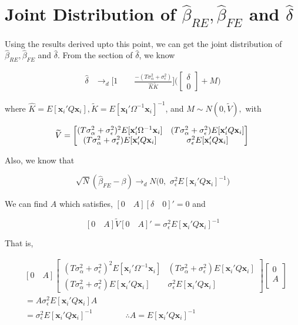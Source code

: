 \documentclass[11pt]{article}
\begin{document}
\section*{Joint Distribution of $\widehat{\beta}_{RE}, \widehat{\beta}_{FE}$ and $\widehat{\delta}$}

Using the results derived upto this point, we can get the joint distribution of $\widehat{\beta}_{RE}, \widehat{\beta}_{FE}$ and $\widehat{\delta}$. From the section of $\widehat{\delta}$, we know

\begin{align*}
\widehat{\delta} & \rightarrow_d \bigg [1 \qquad \frac{-(T\sigma_\alpha^2 +\sigma_\epsilon^2)}{\widehat{K} \widetilde{K}} \bigg ]  \bigg( \begin{bmatrix}
\delta \\
0  
\end{bmatrix} + M\bigg)
\end{align*}

where $ \widehat{K} = E[\mathbf{x}_i' Q \mathbf{x}_i],  \widetilde{K}=E[\mathbf{x_i}' \Omega^{-1} \mathbf{x}_i]^{-1}$, and $M \sim N(0, \widetilde{V}),$ with

\[
\widetilde{V} =  \begin{bmatrix}
(T\sigma_\alpha^2 + \sigma_\epsilon^2)^2 E[\mathbf{x}_i' \Omega^{-1} \mathbf{x}_i] & (T\sigma_\alpha^2 + \sigma_\epsilon^2) E[\mathbf{x}_i' Q \mathbf{x}_i] \\
 (T\sigma_\alpha^2 + \sigma_\epsilon^2) E[\mathbf{x}_i' Q \mathbf{x}_i] & \sigma_\epsilon^2 E[\mathbf{x}_i' Q \mathbf{x}_i]
\end{bmatrix} \\
\]

Also, we know that

\[
\sqrt{N} (\widehat{\beta}_{FE}-\beta) \rightarrow_{d} N\big(0,\,\, \sigma_\epsilon^2 E[\mathbf{x}_i' Q \mathbf{x}_i]^{-1}\big)
\]

We can find $A$ which satisfies, $[0 \quad A][\delta \quad 0]' = 0$ and 

\[
[0 \quad A] \widetilde{V} [0 \quad A]' = \sigma_\epsilon^2 E[\mathbf{x}_i' Q \mathbf{x}_i]^{-1}
\]

That is,

\begin{align*}
&[0 \quad A]  \begin{bmatrix}
(T\sigma_\alpha^2 + \sigma_\epsilon^2)^2 E[\mathbf{x}_i' \Omega^{-1} \mathbf{x}_i] & (T\sigma_\alpha^2 + \sigma_\epsilon^2) E[\mathbf{x}_i' Q \mathbf{x}_i] \\
 (T\sigma_\alpha^2 + \sigma_\epsilon^2) E[\mathbf{x}_i' Q \mathbf{x}_i] & \sigma_\epsilon^2 E[\mathbf{x}_i' Q \mathbf{x}_i]
\end{bmatrix} \begin{bmatrix}
0\\
A\\
\end{bmatrix} \\ & = A \sigma_\epsilon^2 E[\mathbf{x}_i' Q \mathbf{x}_i] A\\ &= \sigma_\epsilon^2 E[\mathbf{x}_i' Q \mathbf{x}_i]^{-1} \qquad \qquad \therefore A= E[\mathbf{x}_i' Q \mathbf{x}_i]^{-1}
\end{align*}
\end{document}
